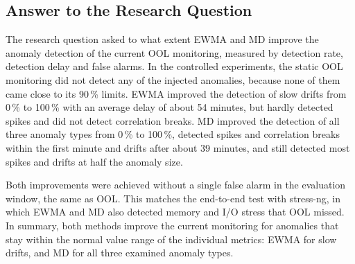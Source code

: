 \subsection{Answer to the Research Question}
The research question asked to what extent EWMA and MD improve the anomaly detection of the current OOL monitoring, measured by detection rate, detection delay and false alarms. In the controlled experiments, the static OOL monitoring did not detect any of the injected anomalies, because none of them came close to its 90\,\% limits. EWMA improved the detection of slow drifts from 0\,\% to 100\,\% with an average delay of about 54 minutes, but hardly detected spikes and did not detect correlation breaks. MD improved the detection of all three anomaly types from 0\,\% to 100\,\%, detected spikes and correlation breaks within the first minute and drifts after about 39 minutes, and still detected most spikes and drifts at half the anomaly size.

Both improvements were achieved without a single false alarm in the evaluation window, the same as OOL. This matches the end-to-end test with stress-ng, in which EWMA and MD also detected memory and I/O stress that OOL missed. In summary, both methods improve the current monitoring for anomalies that stay within the normal value range of the individual metrics: EWMA for slow drifts, and MD for all three examined anomaly types.
